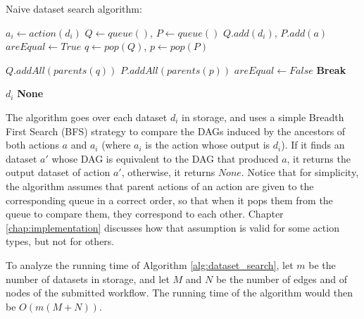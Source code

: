 \begin{algorithm}
\begin{singlespace}
\caption{Naive dataset search algorithm:}
\label{alg:dataset_search}
\begin{algorithmic}[1]
		\State $a_i \gets action(d_i)$ 
		\State $Q \gets queue()$, $P \gets queue()$
		\State $Q.add(d_i)$, $P.add(a)$
		\State $areEqual \gets True$
			\State $q \gets pop(Q)$, $p \gets pop(P)$
			
				\State $Q.addAll(parents(q))$ 
				\State $P.addAll(parents(p))$ 
			\Else
				\State $areEqual \gets False$
				\State \textbf{Break}
			\EndIf
			
		\EndWhile
			\Return $d_i$
		\EndIf
	\EndFor
	\Return \textbf{None}
\EndProcedure
\end{algorithmic}
\end{singlespace}
\end{algorithm}

The algorithm goes over each dataset $d_i$ in storage, and uses a simple Breadth First Search (BFS) strategy to compare the DAGs induced by the ancestors of both actions $a$ and $a_i$ (where $a_i$ is the action whose output is $d_i$).  If it finds an dataset $a'$ whose DAG is equivalent to the DAG that produced $a$, it returns the output dataset of action $a'$, otherwise, it returns $None$.  Notice that for simplicity, the algorithm assumes that parent actions of an action are given to the corresponding queue in a correct order, so that when it pops them from the queue to compare them, they correspond to each other.  Chapter \ref{chap:implementation} discusses how that assumption is valid for some action types, but not for others.

To analyze the running time of Algorithm \ref{alg:dataset_search}, let $m$ be the number of datasets in storage, and let $M$ and $N$ be the number of edges and of nodes of the submitted workflow.  The running time of the algorithm would then be $O(m (M + N))$.

